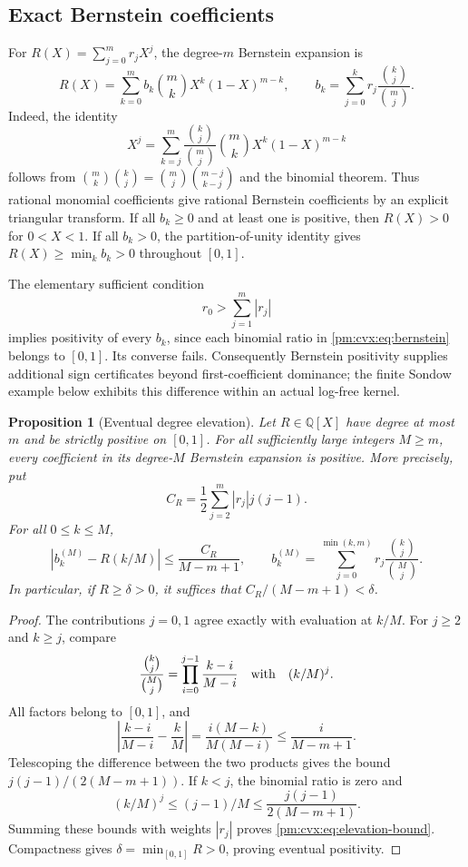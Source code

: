 \documentclass[11pt,a4paper]{article}
\newcommand{\Q}{\mathbb Q}
\newtheorem{proposition}[theorem]{Proposition}
\theoremstyle{definition}
\theoremstyle{remark}
\numberwithin{equation}{section}
\begin{document}
\subsection{Exact Bernstein coefficients}

For $R(X)=\sum_{j=0}^m r_jX^j$, the degree-$m$ Bernstein expansion is
\begin{equation}\label{pm:cvx:eq:bernstein}
 R(X)=\sum_{k=0}^m b_k\binom mkX^k(1-X)^{m-k},\qquad
 b_k=\sum_{j=0}^k r_j\frac{\binom kj}{\binom mj}.
\end{equation}
Indeed, the identity
\[
 X^j=\sum_{k=j}^m\frac{\binom kj}{\binom mj}
                     \binom mkX^k(1-X)^{m-k}
\]
follows from $\binom mk\binom kj=\binom mj\binom{m-j}{k-j}$
and the binomial theorem.  Thus rational monomial coefficients give
rational Bernstein coefficients by an explicit triangular transform.
If all $b_k\ge0$ and at least one is positive, then $R(X)>0$ for
$0<X<1$.  If all $b_k>0$, the partition-of-unity identity gives
$R(X)\ge\min_kb_k>0$ throughout $[0,1]$.

The elementary sufficient condition
\begin{equation}\label{pm:cvx:eq:dominance}
 r_0>\sum_{j=1}^m|r_j|
\end{equation}
implies positivity of every $b_k$, since each binomial ratio in
\eqref{pm:cvx:eq:bernstein} belongs to $[0,1]$.  Its converse fails.
Consequently Bernstein positivity supplies additional sign
certificates beyond first-coefficient dominance; the finite Sondow
example below exhibits this difference within an actual log-free
kernel.

\begin{proposition}[Eventual degree elevation]
\label{pm:cvx:prop:elevation}
Let $R\in\Q[X]$ have degree at most $m$ and be strictly positive
on $[0,1]$.  For all sufficiently large integers $M\ge m$, every
coefficient in its degree-$M$ Bernstein expansion is positive.
More precisely, put
\[
 C_R=\frac12\sum_{j=2}^m |r_j|j(j-1).
\]
For all $0\le k\le M$,
\begin{equation}\label{pm:cvx:eq:elevation-bound}
 \left|b_k^{(M)}-R(k/M)\right|
 \le\frac{C_R}{M-m+1},\qquad
 b_k^{(M)}=\sum_{j=0}^{\min(k,m)}
                    r_j\frac{\binom kj}{\binom Mj}.
\end{equation}
In particular, if $R\ge\delta>0$, it suffices that
$C_R/(M-m+1)<\delta$.
\end{proposition}
\begin{proof}
The contributions $j=0,1$ agree exactly with evaluation at $k/M$.
For $j\ge2$ and $k\ge j$, compare
\[
 \frac{\binom kj}{\binom Mj}
 =\prod_{i=0}^{j-1}\frac{k-i}{M-i}
 \quad\hbox{with}\quad
 (k/M)^j.
\]
All factors belong to $[0,1]$, and
\[
 \left|\frac{k-i}{M-i}-\frac{k}{M}\right|
 =\frac{i(M-k)}{M(M-i)}\le\frac{i}{M-m+1}.
\]
Telescoping the difference between the two products gives the bound
$j(j-1)/(2(M-m+1))$.  If $k<j$, the binomial ratio is zero and
\[
 (k/M)^j\le (j-1)/M
 \le \frac{j(j-1)}{2(M-m+1)}.
\]
Summing these bounds with weights $|r_j|$ proves
\eqref{pm:cvx:eq:elevation-bound}.  Compactness gives
$\delta=\min_{[0,1]}R>0$, proving eventual positivity.
\end{proof}
\end{document}
